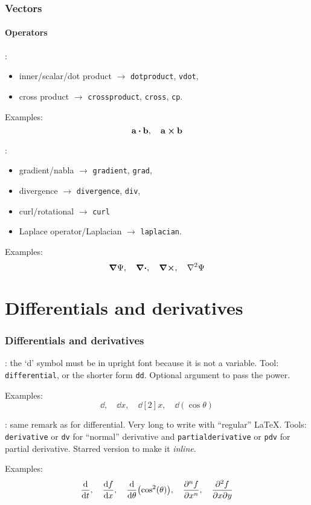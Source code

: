 \documentclass[11pt]{beamer}
\begin{document}
\begin{frame}
	\frametitle{Vectors}
	\framesubtitle{Operators}
	
	:
	\begin{itemize}
		\item inner/scalar/dot product $\rightarrow$ \texttt{dotproduct}, \texttt{vdot},
		\item cross product $\rightarrow$ \texttt{crossproduct}, \texttt{cross}, \texttt{cp}.
	\end{itemize}
	
	Examples:
	\begin{equation*}
		\vb{a} \vdot \vb{b}, \quad
		\vb{a} \cp \vb{b}
	\end{equation*}
	
	
	:
	\begin{itemize}
		\item gradient/nabla $\rightarrow$ \texttt{gradient}, \texttt{grad},
		\item divergence $\rightarrow$ \texttt{divergence}, \texttt{div},
		\item curl/rotational $\rightarrow$ \texttt{curl}
		\item Laplace operator/Laplacian $\rightarrow$ \texttt{laplacian}.
	\end{itemize}
	
	Examples:
	\begin{equation*}
		\grad{\Psi}, \quad
		\div, \quad
		\curl, \quad
		\laplacian{\Psi}
	\end{equation*}
\end{frame}


\section{Differentials and derivatives}

\begin{frame}
	\frametitle{Differentials and derivatives}
	
	: the `d' symbol must be in upright font because it is not a variable.
	Tool: \texttt{differential}, or the shorter form \texttt{dd}.
	Optional argument to pass the power.
	
	Examples:
	\begin{equation*}
		\dd, \quad
		\dd{x}, \quad
		\dd[2]{x}, \quad
		\dd(\cos\theta)
	\end{equation*}
	
	
	: same remark as for differential.
	Very long to write with \enquote{regular} \LaTeX{}.
	Tools: \texttt{derivative} or \texttt{dv} for \enquote{normal} derivative and \texttt{partialderivative} or \texttt{pdv} for partial derivative.
	Starred version to make it \emph{inline}.
	
	Examples:
	\begin{equation*}
		\dv{t}, \quad
		\dv{f}{x}, \quad
		\dv{\theta}(\cos[2](\theta)), \quad
		\pdv[n]{f}{x}, \quad
		\pdv{f}{x}{y}
	\end{equation*}
\end{frame}
\end{document}
